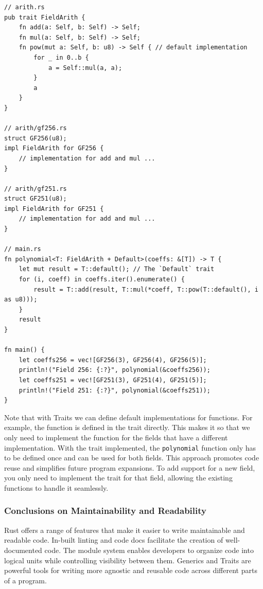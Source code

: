 \documentclass[11pt]{report}
\theoremstyle{definition}
\theoremstyle{plain}
\begin{document}
\begin{verbatim}
// arith.rs
pub trait FieldArith {
    fn add(a: Self, b: Self) -> Self;
    fn mul(a: Self, b: Self) -> Self;
    fn pow(mut a: Self, b: u8) -> Self { // default implementation
        for _ in 0..b {
            a = Self::mul(a, a);
        }
        a
    }
}

// arith/gf256.rs
struct GF256(u8);
impl FieldArith for GF256 {
    // implementation for add and mul ...
}

// arith/gf251.rs
struct GF251(u8);
impl FieldArith for GF251 {
    // implementation for add and mul ...
}

// main.rs
fn polynomial<T: FieldArith + Default>(coeffs: &[T]) -> T {
    let mut result = T::default(); // The `Default` trait
    for (i, coeff) in coeffs.iter().enumerate() {
        result = T::add(result, T::mul(*coeff, T::pow(T::default(), i as u8)));
    }
    result
}

fn main() {
    let coeffs256 = vec![GF256(3), GF256(4), GF256(5)];
    println!("Field 256: {:?}", polynomial(&coeffs256));
    let coeffs251 = vec![GF251(3), GF251(4), GF251(5)];
    println!("Field 251: {:?}", polynomial(&coeffs251));
}
\end{verbatim}

Note that with Traits we can define default implementations for functions. For example, the  function is defined in the trait directly. This makes it so that we only need to implement the function for the fields that have a different implementation. With the trait implemented, the \texttt{polynomial} function only has to be defined once and can be used for both fields. This approach promotes code reuse and simplifies future program expansions. To add support for a new field, you only need to implement the  trait for that field, allowing the existing functions to handle it seamlessly.

\subsubsection{Conclusions on Maintainability and Readability}
Rust offers a range of features that make it easier to write maintainable and readable code. In-built linting and code docs facilitate the creation of well-documented code. The module system enables developers to organize code into logical units while controlling visibility between them. Generics and Traits are powerful tools for writing more agnostic and reusable code across different parts of a program.
\end{document}
